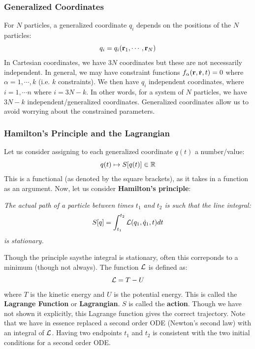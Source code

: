 \subsubsection{Generalized Coordinates}
For $N$ particles, a generalized coordinate $q_i$ depends on the positions of the $N$ particles:
\[q_i = q_i(\mathbf{r}_1, \cdots, \mathbf{r}_N)\]
In Cartesian coordinates, we have $3N$ coordinates but these are not necessarily independent. In general, we may have constraint functions $f_\alpha(\mathbf{r}, \dot{\mathbf{r}}, t) = 0$ where $\alpha = 1, \cdots, k$ (i.e. $k$ constraints). We then have $q_i$ independent coordinates, where $i = 1, \cdots n$ where $i = 3N - k$. In other words, for a system of $N$ particles, we have $3N - k$ independent/generalized coordinates. Generalized coordinates allow us to avoid worrying about the constrained parameters. 
\subsubsection{Hamilton's Principle and the Lagrangian}
Let us consider assigning to each generalized coordinate $q(t)$ a number/value:
\[q(t) \mapsto S[q(t)] \in \mathbb{R}\]
This is a functional (as denoted by the square brackets), as it takes in a function as an argument. Now, let us consider \textbf{Hamilton's principle}:
\begin{center}
    \textit{The actual path of a particle between times $t_1$ and $t_2$ is such that the line integral:
    \[ S[q] = \int_{t_1}^{t_2} \mathcal{L}(q_1, \dot{q}_1, t) dt\]
    is stationary.}
\end{center}
Though the principle saysthe integral is stationary, often this correponds to a minimum (though not always). The function $\mathcal{L}$ is defined as:
\[\mathcal{L} = T - U\]
where $T$ is the kinetic energy and $U$ is the potential energy. This is called the \textbf{Lagrange Function} or \textbf{Lagrangian}. $S$ is called the \textbf{action}. Though we have not shown it explicitly, this Lagrange function gives the correct trajectory. Note that we have in essence replaced a second order ODE (Newton's second law) with an integral of $\mathcal{L}$. Having two endpoints $t_1$ and $t_2$ is consistent with the two initial conditions for a second order ODE. 